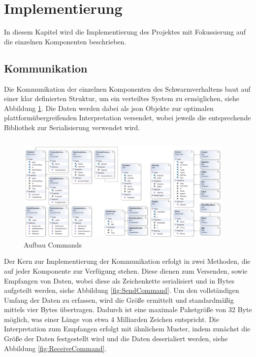 \section{Implementierung}

In diesem Kapitel wird die Implementierung des Projektes mit Fokussierung auf die einzelnen Komponenten beschrieben.

\subsection{Kommunikation}

Die Kommunikation der einzelnen Komponenten des Schwarmverhaltens baut auf einer klar definierten Struktur, um ein verteiltes System zu ermöglichen, siehe Abbildung \ref{fig:full_classdiagram}. Die Daten werden dabei als \gls{json} Objekte zur optimalen plattformübergreifenden Interpretation versendet, wobei jeweils die entsprechende Bibliothek zur Serialisierung verwendet wird.
\begin{verbatim}
\end{verbatim}
\begin{figure}[h]
	\begin{center}
		\includegraphics[width=0.95\textwidth]{images/uml/full_class_diagram.png}
	\end{center}
	\caption{Aufbau Commands}
	\label{fig:full_classdiagram}
\end{figure}

\newpage
\noindent
Der Kern zur Implementierung der Kommunikation erfolgt in zwei Methoden, die auf jeder Komponente zur Verfügung stehen. Diese dienen zum Versenden, sowie Empfangen von Daten, wobei diese als Zeichenkette serialisiert und in Bytes aufgeteilt werden, siehe Abbildung \ref{fig:SendCommand}. Um den vollständigen Umfang der Daten zu erfassen, wird die Größe ermittelt und standardmäßig mittels vier Bytes übertragen. Dadurch ist eine maximale Paketgröße von 32 Byte möglich, was einer Länge von etwa 4 Milliarden Zeichen entspricht. Die Interpretation zum Empfangen erfolgt mit ähnlichem Muster, indem zunächst die Größe der Daten festgestellt wird und die Daten deserialiert werden, siehe Abbildung \ref{fig:ReceiveCommand}.

